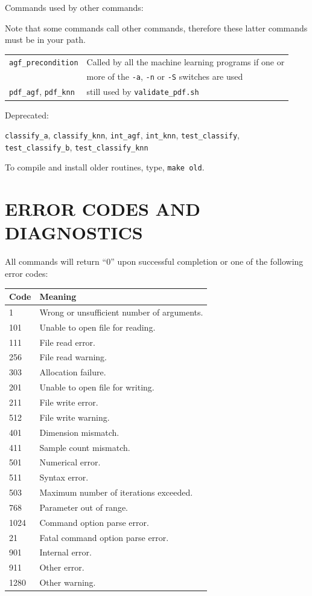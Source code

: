 \documentclass[12pt]{article}
\begin{document}
Commands used by other commands:

  Note that some commands call other commands, therefore these latter commands must be in your path.

\begin{tabular}{ll}
  \verb/agf_precondition/ & Called by all the machine learning programs if one or\\
			  & more of the \verb"-a", \verb"-n" or \verb"-S" switches are used\\
  \verb/pdf_agf/, \verb/pdf_knn/ & still used by \verb/validate_pdf.sh/
\end{tabular}

Deprecated:

  \verb/classify_a/, \verb/classify_knn/, \verb/int_agf/, \verb/int_knn/, \verb/test_classify/, \verb/test_classify_b/, \verb/test_classify_knn/

To compile and install older routines, type, \verb"make old".


\section{ERROR CODES AND DIAGNOSTICS}

  All commands will return ``0'' upon successful completion or one of the following error codes:

\begin{tabular}{ll}
Code & Meaning\\
\hline
  1	&	Wrong or unsufficient number of arguments.\\
101	&	Unable to open file for reading.\\
111	&	File read error.\\
256	&	File read warning.\\
303	&	Allocation failure.\\
201	&	Unable to open file for writing.\\
211	&	File write error.\\
512	&	File write warning.\\
401	&	Dimension mismatch.\\
411	&	Sample count mismatch.\\
501	&	Numerical error.\\
511	&	Syntax error.\\
503	&	Maximum number of iterations exceeded.\\
768	&	Parameter out of range.\\
1024	&	Command option parse error.\\
 21	&	Fatal command option parse error.\\
901	&	Internal error.\\
911	&	Other error.\\
1280	&	Other warning.
\end{tabular}
\end{document}
